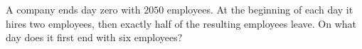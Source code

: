 A company ends day zero with $2050$ employees. At the beginning of each day it hires two employees, then exactly half of the resulting employees leave. On what day does it first end with six employees?
